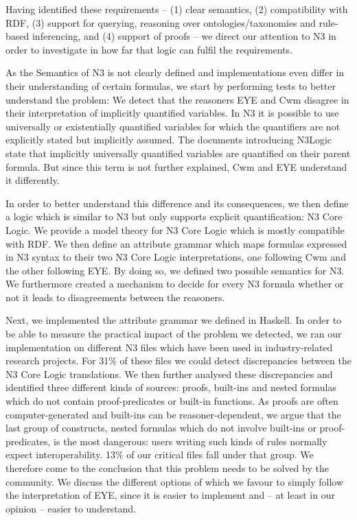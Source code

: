 Having identified these requirements -- (1) clear semantics, (2) compatibility with RDF, (3) support for querying, reasoning over ontologies/taxonomies and 
rule-based inferencing, and
(4) support of proofs -- we direct our attention to N3 in order to investigate in how far that logic can fulfil the requirements.

As the Semantics of N3 is not clearly defined and implementations even differ in their understanding of certain formulas, we start by performing tests to better understand the 
problem: We detect that the reasoners EYE and Cwm disagree in their interpretation of implicitly quantified variables. In N3 it is possible to use universally or 
existentially quantified variables for which the quantifiers are not explicitly stated but implicitly assumed. The documents 
introducing N3Logic state that implicitly universally quantified variables are quantified on their parent formula. But since this term 
is not further explained, Cwm and EYE understand it differently.

In order to better understand this difference and its consequences, we then define a logic which is similar to N3 but only supports explicit quantification: N3 Core Logic.
We provide a model theory for N3 Core Logic which is mostly compatible with RDF. We then define an attribute grammar which maps formulas expressed in N3 syntax to their two
N3 Core Logic interpretations, one following Cwm and the other following EYE. By doing so, we defined two possible semantics for N3. 
We furthermore created a mechanism to decide for every N3 formula whether or not it leads to disagreements between the reasoners.

Next, we implemented the attribute grammar we defined in Haskell. In order to be able to measure the practical impact of the problem we detected, we ran our 
implementation on different N3 files which have been used in industry-related research projects. For 31\% of these files we could detect discrepancies between the 
N3 Core Logic translations. We then further analysed these discrepancies and identified three different kinds of sources: proofs, built-ins and nested formulas 
which do not contain proof-predicates or built-in functions. 
As proofs are often computer-generated and  built-ins can be reasoner-dependent,
we argue that the last group of constructs, nested formulas which do not involve built-ins or proof-predicates, is the most dangerous:
users writing such kinds of rules normally expect interoperability. 13\% of our critical files fall under that group.
We therefore come to the conclusion that this problem needs to be solved by the community. We discuss the different options of which we favour 
to simply follow the interpretation of EYE, since it is easier to implement and -- at least in our opinion -- easier to understand.


